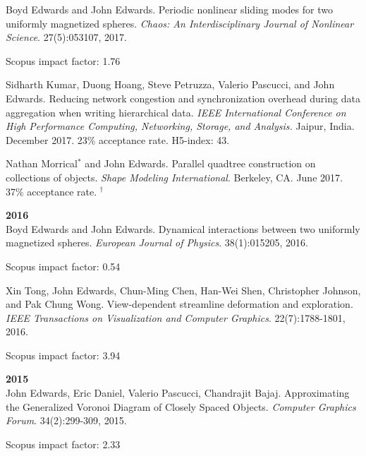 \documentclass[margin,line]{res}
\newcommand{\pubunder}[1]{#1}
\newcommand{\pnum}[1]{}
\begin{document}
\begin{resume}
\pnum{14} Boyd Edwards and \pubunder{John Edwards}. Periodic nonlinear sliding modes for two uniformly magnetized spheres. \textit{Chaos: An Interdisciplinary Journal of Nonlinear Science}. 27(5):053107, 2017.
\begin{IMPACT}
Scopus impact factor: 1.76 %
\end{IMPACT}

\pnum{13} Sidharth Kumar, Duong Hoang, Steve Petruzza, Valerio Pascucci, and \pubunder{John Edwards}. Reducing network congestion and synchronization overhead during data aggregation when writing hierarchical data. \textit{IEEE International Conference on High Performance Computing, Networking, Storage, and Analysis.} Jaipur, India. December 2017. 23\% acceptance rate. H5-index: 43.

\pnum{12} Nathan Morrical$^*$ and \pubunder{John Edwards}. Parallel quadtree construction on collections of objects. \textit{Shape Modeling International}. Berkeley, CA. June 2017. 37\% acceptance rate.
$^\dagger$

\textbf{2016} \\
\pnum{11} Boyd Edwards and \pubunder{John Edwards}. Dynamical interactions between two uniformly magnetized spheres. \textit{European Journal of Physics}. 38(1):015205, 2016.
\begin{IMPACT}
Scopus impact factor: 0.54 %
\end{IMPACT}

\pnum{10} Xin Tong, \pubunder{John Edwards}, Chun-Ming Chen, Han-Wei Shen, Christopher Johnson, and Pak Chung Wong. View-dependent streamline deformation and exploration. \textit{IEEE Transactions on Visualization and Computer Graphics}. 22(7):1788-1801, 2016.
\begin{IMPACT}
Scopus impact factor: 3.94 %
\end{IMPACT}

\textbf{2015} \\
\pnum{9} \pubunder{John Edwards}, Eric Daniel, Valerio Pascucci, Chandrajit Bajaj. Approximating the Generalized Voronoi Diagram of Closely Spaced Objects. \textit{Computer Graphics Forum}. 34(2):299-309, 2015.
\begin{IMPACT}
Scopus impact factor: 2.33 %
\end{IMPACT}


\end{resume}
\end{document}
